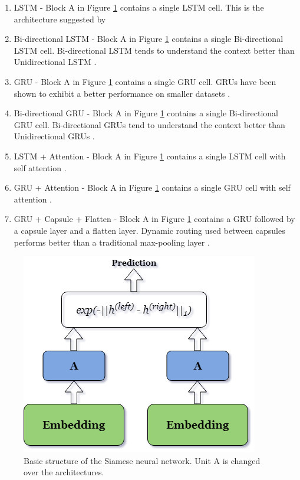 \begin{enumerate}
	\item LSTM - Block A in Figure \ref{fig:siamese} contains a single LSTM cell. This is the architecture suggested by \textcite{Mueller_Thyagarajan_2016} 
	
	\item Bi-directional LSTM - Block A in Figure \ref{fig:siamese} contains a single Bi-directional LSTM cell. Bi-directional LSTM tends to understand the context better than Unidirectional LSTM \autocite{650093}.
	
	\item GRU - Block A in Figure \ref{fig:siamese} contains a single GRU cell. GRUs have been shown to exhibit a better performance on smaller datasets \autocite{Chung2014EmpiricalEO}. 
	
	\item Bi-directional GRU - Block A in Figure \ref{fig:siamese} contains a single Bi-directional GRU cell. Bi-directional GRUs tend to understand the context better than Unidirectional GRUs \autocite{vukotic:hal-01351733}.
	
	\item LSTM + Attention - Block A in Figure \ref{fig:siamese} contains a single LSTM cell with self attention \autocite{NIPS2017_3f5ee243}.
	
	\item GRU + Attention - Block A in Figure \ref{fig:siamese} contains a single GRU cell with self attention \autocite{NIPS2017_3f5ee243}.
	
	\item GRU + Capsule + Flatten - Block A in Figure \ref{fig:siamese} contains a GRU followed by a capsule layer and a flatten layer. Dynamic routing used between capsules performs better than a traditional max-pooling layer \autocite{NIPS2017_2cad8fa4}.
	
\end{enumerate}

\begin{figure}[ht]
	\centering
	\includegraphics[scale=0.5]{figures/semantic_textual_similarity/siamese_neural_networks/siamese_architecture.png}
	\caption[Basic structure of the Siamese neural network]{Basic structure of the Siamese neural network. Unit A is changed over the architectures.}
	\label{fig:siamese}
\end{figure}


